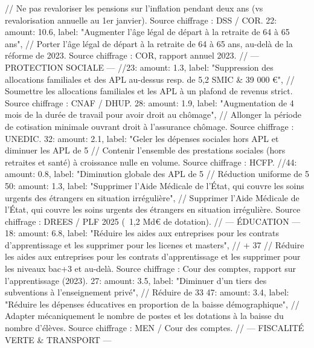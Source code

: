 {{{{{{{{{{{{			  // Ne pas revaloriser les pensions sur l'inflation pendant deux ans (vs revalorisation annuelle au 1er janvier). Source chiffrage : DSS / COR.
		22: { amount: 10.6, label: "Augmenter l'âge légal de départ à la retraite de 64 à 65 ans"},
			  // Porter l'âge légal de départ à la retraite de 64 à 65 ans, au-delà de la réforme de 2023. Source chiffrage : COR, rapport annuel 2023.
		// --- PROTECTION SOCIALE ---
		//23: { amount: 1.3,  label: "Suppression des allocations familiales et des APL au-dessus resp. de 5,2 SMIC & 39 000 €"},
			  // Soumettre les allocations familiales et les APL à un plafond de revenus strict. Source chiffrage : CNAF / DHUP.
		28: { amount: 1.9,  label: "Augmentation de 4 mois de la durée de travail pour avoir droit au chômage"},
			  // Allonger la période de cotisation minimale ouvrant droit à l'assurance chômage. Source chiffrage : UNEDIC.
		32: { amount: 2.1,  label: "Geler les dépenses sociales hors APL et diminuer les APL de 5%
			  // Contenir l'ensemble des prestations sociales (hors retraites et santé) à croissance nulle en volume. Source chiffrage : HCFP.
		//44: { amount: 0.8,  label: "Diminution globale des APL de 5 %
			  // Réduction uniforme de 5 %
		50: { amount: 1.3,  label: "Supprimer l'Aide Médicale de l'État, qui couvre les soins urgents des étrangers en situation irrégulière"},
			  // Supprimer l'Aide Médicale de l'État, qui couvre les soins urgents des étrangers en situation irrégulière. Source chiffrage : DREES / PLF 2025 (~1,2 Md€ de dotation).
		// --- ÉDUCATION ---
		18: { amount: 6.8,  label: "Réduire les aides aux entreprises pour les contrats d'apprentissage et les supprimer pour les licenes et masters"}, // + 37
			  // Réduire les aides aux entreprises pour les contrats d'apprentissage et les supprimer pour les niveaux bac+3 et au-delà. Source chiffrage : Cour des comptes, rapport sur l'apprentissage (2023).
		27: { amount: 3.5,  label: "Diminuer d'un tiers des subventions à l'enseignement privé"},
			  // Réduire de 33 %
		47: { amount: 3.4,  label: "Réduire les dépenses éducatives en proportion de la baisse démographique"},
			  // Adapter mécaniquement le nombre de postes et les dotations à la baisse du nombre d'élèves. Source chiffrage : MEN / Cour des comptes.
		// --- FISCALITÉ VERTE & TRANSPORT ---
}}}}}}}}}}}}}}
